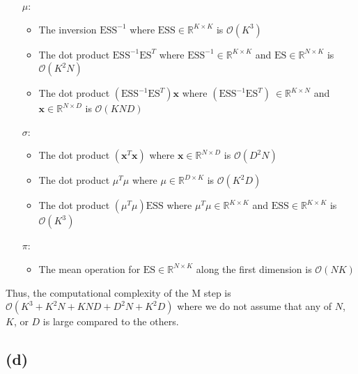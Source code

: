\documentclass[12pt]{article}
\begin{document}
\begin{itemize}
\item [$\mu$:]\begin{itemize}
\item The inversion $\text{ESS}^{-1}$ where $\text{ESS} \in \mathbb{R}^{K \times K}$ is $\mathcal{O}(K^3)$
\item The dot product $\text{ESS}^{-1} \text{ES}^T$ where $\text{ESS}^{-1} \in \mathbb{R}^{K \times K}$ and $\text{ES} \in \mathbb{R}^{N \times K}$ is  $\mathcal{O}(K^2N)$
\item The dot product $(\text{ESS}^{-1} \text{ES}^T)\textbf{x}$ where $(\text{ESS}^{-1} \text{ES}^T)\ \in \mathbb{R}^{K \times N}$ and $\textbf{x} \in \mathbb{R}^{N \times D}$ is  $\mathcal{O}(KND )$
\end{itemize}

\item [$\sigma$:] \begin{itemize}
\item The dot product $(\textbf{x}^{T} \textbf{x})$ where $\textbf{x} \in \mathbb{R}^{N \times D}$ is  $\mathcal{O}(D^2N)$
\item The dot product $\mu^{T} \mu$ where $\mu \in \mathbb{R}^{D \times K}$ is  $\mathcal{O}(K^2D)$
\item The dot product $(\mu^{T} \mu)\text{ESS}$ where $\mu^{T} \mu \in \mathbb{R}^{K \times K}$ and $\text{ESS} \in \mathbb{R}^{K \times K}$ is $\mathcal{O}(K^3)$
\end{itemize}
\item [$\pi$:] \begin{itemize}
    \item The mean operation for $\text{ES} \in \mathbb{R}^{N \times K}$ along the first dimension is $\mathcal{O}(NK)$
    \end{itemize}
\end{itemize}

Thus, the computational complexity of the M step is $\mathcal{O}(K^3+K^2N + KND + D^2N + K^2D)$ where we do not assume that any of $N$, $K$, or $D$ is large compared to the others.
\newpage
\subsection*{(d)}
\end{document}
